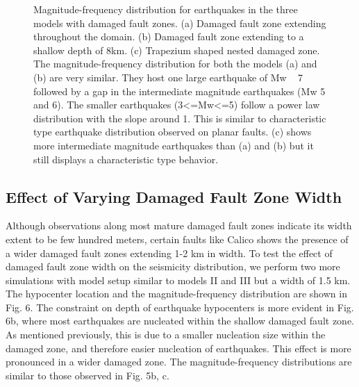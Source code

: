 \documentclass[11pt]{article}
\begin{document}
\begin{figure}[!htb]
{    }
    \caption{Magnitude-frequency distribution for earthquakes in the three models with damaged fault zones. (a) Damaged fault zone extending throughout the domain. (b) Damaged fault zone extending to a shallow depth of 8km. (c)  Trapezium shaped nested damaged zone. The magnitude-frequency distribution for both the models (a) and (b) are very similar. They host one large earthquake of Mw ~ 7 followed by a gap in the intermediate magnitude earthquakes (Mw 5 and 6). The smaller earthquakes (3<=Mw<=5) follow a power law distribution with the slope around 1. This is similar to characteristic type earthquake distribution observed on planar faults. (c) shows more intermediate magnitude earthquakes than (a) and (b) but it still displays a characteristic type behavior.}
\end{figure}

\subsection{Effect of Varying Damaged Fault Zone Width}
Although observations along most mature damaged fault zones indicate its width extent to be few hundred meters, certain faults like Calico \citep{cochran_2009} shows the presence of a wider damaged fault zones extending 1-2 km in width. To test the effect of damaged fault zone width on the seismicity distribution, we perform two more simulations with model setup similar to models II and III but a width of 1.5 km. The hypocenter location and the magnitude-frequency distribution are shown in Fig. 6. The constraint on depth of earthquake hypocenters is more evident in Fig. 6b, where most earthquakes are nucleated within the shallow damaged fault zone. As mentioned previously, this is due to a smaller nucleation size within the damaged zone, and therefore easier nucleation of earthquakes. This effect is more pronounced in a wider damaged zone. The magnitude-frequency distributions are similar to those observed in Fig. 5b, c.
\end{document}
